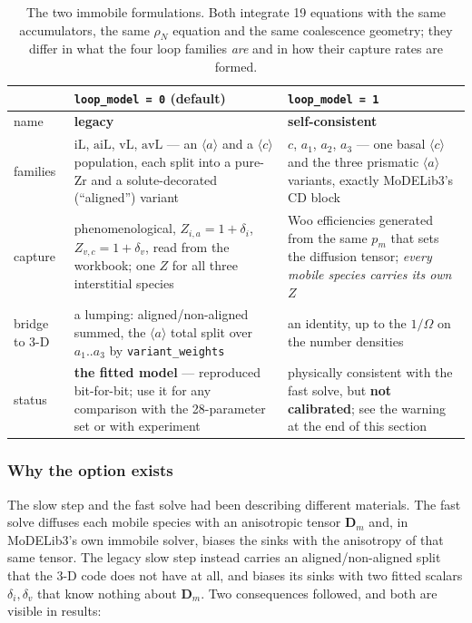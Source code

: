\documentclass[11pt]{article}
\newcommand{\aloop}{\ensuremath{\langle a\rangle}}
\newcommand{\cloop}{\ensuremath{\langle c\rangle}}
\newcommand{\MoD}{\textsf{MoDELib3}}
\newcommand{\code}[1]{\texttt{\small #1}}
\begin{document}
\begin{table}[htbp]
\centering
\caption{The two immobile formulations. Both integrate 19 equations with the
         same accumulators, the same $\rho_N$ equation and the same
         coalescence geometry; they differ in what the four loop families
         \emph{are} and in how their capture rates are formed.}
\label{tab:loopmodel}
\begin{tabular}{@{}lp{4.9cm}p{5.4cm}@{}}
\toprule
 & \code{loop\_model = 0} (default) & \code{loop\_model = 1} \\
\midrule
name & \textbf{legacy} & \textbf{self-consistent} \\[3pt]
families &
  $\mathrm{iL}$, $\mathrm{aiL}$, $\mathrm{vL}$, $\mathrm{avL}$ --- an
  \aloop{} and a \cloop{} population, each split into a pure-Zr and a
  solute-decorated (``aligned'') variant &
  $c$, $a_1$, $a_2$, $a_3$ --- one basal \cloop{} and the three prismatic
  \aloop{} variants, exactly \MoD{}'s CD block \\[3pt]
capture &
  phenomenological, $Z_{i,a}=1+\delta_i$, $Z_{v,c}=1+\delta_v$, read from the
  workbook; one $Z$ for all three interstitial species &
  Woo efficiencies generated from the same $p_m$ that sets the diffusion
  tensor; \emph{every mobile species carries its own} $Z$ \\[3pt]
bridge to 3-D &
  a lumping: aligned/non-aligned summed, the \aloop{} total split over
  $a_1..a_3$ by \code{variant\_weights} &
  an identity, up to the $1/\Omega$ on the number densities \\[3pt]
status &
  \textbf{the fitted model} --- reproduced bit-for-bit; use it for any
  comparison with the 28-parameter set or with experiment &
  physically consistent with the fast solve, but \textbf{not calibrated};
  see the warning at the end of this section \\
\bottomrule
\end{tabular}
\end{table}

\subsubsection{Why the option exists}

The slow step and the fast solve had been describing different materials. The
fast solve diffuses each mobile species with an anisotropic tensor
$\mathbf{D}_m$ and, in \MoD{}'s own immobile solver, biases the sinks with the
anisotropy of that same tensor. The legacy slow step instead carries an
aligned/non-aligned split that the 3-D code does not have at all, and biases
its sinks with two fitted scalars $\delta_i,\delta_v$ that know nothing about
$\mathbf{D}_m$. Two consequences followed, and both are visible in results:
\end{document}
